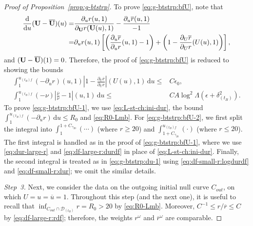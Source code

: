 \documentclass[10pt, reqno]{amsart}
\theoremstyle{definition}
\theoremstyle{remark}
\theoremstyle{conjecture}
\numberwithin{equation}{section}
\newcommand{\ud}{\mathrm{d}}
\newcommand{\rd}{\partial}
\newcommand{\0}{\emptyset}
\newcommand{\gmm}{\gamma}
\newcommand{\dlt}{\delta}
\newcommand{\eps}{\epsilon}
\newcommand{\Lmb}{\Lambda}
\newcommand{\omg}{\omega}
\newcommand{\bfU}{{\bf U}}
\newcommand{\calD}{\mathcal D}
\newcommand{\calI}{\mathcal I}
\newcommand{\dur}{\nu}
\newcommand{\pfstep}[1]{\vspace{.5em} {\it \noindent #1.}}
\newcommand{\NI}{\calI^{+}}						%
\newcommand{\ubg}{\overline{u}}					%
\newcommand{\durbg}{\overline{\dur}}				%
\newcommand{\rbg}{\overline{r}}					%
\newcommand{\Abs}[1]{\left\vert #1 \right\vert}
\begin{document}
\begin{proof}[Proof of Proposition~\ref{prop:g-btstrp}]
To prove \eqref{eq:g-btstrp:bfU}, note that 
\begin{align*}
	\frac{\ud}{\ud u} (\bfU - \overline{\bfU})(u)
	 = & \frac{\rd_{u} r(u, 1)}{\rd_{\bfU} r(\bfU(u), 1)} - \frac{\rd_{u} \rbg(u, 1)}{-1} \\
	 = & \rd_{u} r(u, 1) \left[ \left(\frac{\rd_{u} \rbg}{\rd_{u} r} (u,1) - 1 \right) 
	 + \left( 1 - \frac{\rd_{U} \rbg}{\rd_{U} r}(U(u), 1) \right) \right],
\end{align*}
and $(\bfU - \overline{\bfU})(1) = 0$. Therefore, the proof of \eqref{eq:g-btstrp:bfU} is reduced to showing the bounds
\begin{align}
	\int_{1}^{u_{(t_{B}) f}} (- \rd_{u} r)(u, 1) \Abs{1 - \frac{\rd_{U} \rbg}{\rd_{U} r}}(U(u), 1)  \, \ud u \leq & C \eps_{0},
	\label{eq:g-btstrp:bfU-1} \\
	\int_{1}^{u_{(t_{B}) f}} (- \dur) \Abs{\frac{\durbg}{\dur} - 1}(u, 1)  \, \ud u \leq & C A \log^2 \Lmb \left( \eps + \dlt_{(t_{B})}^{2} \right). \label{eq:g-btstrp:bfU-2} 
\end{align}
To prove \eqref{eq:g-btstrp:bfU-1}, we use \eqref{eq:L-st-ch:ini-dur}, the bound $\int_{1}^{u_{(t_{B}) f}} (-\rd_{u} r) \, \ud u \leq R_{0}$ and \eqref{eq:R0-Lmb}. For \eqref{eq:g-btstrp:bfU-2}, we first split the integral into $\int_{1}^{1 + C_{\gmm_{20}}} (\cdots)$ (where $r \geq 20$) and $\int_{1 + C_{\gmm_{20}}}^{u_{(t_{B}) f}} (\cdot)$ (where $r \leq 20$). The first integral is handled as in the proof of \eqref{eq:g-btstrp:bfU-1}, where we use \eqref{eq:dur-large-r} and \eqref{eq:df-large-r:durdf} in place of \eqref{eq:L-st-ch:ini-dur}. Finally, the second integral is treated as in \eqref{eq:g-btstrp:du-1} using \eqref{eq:df-small-r:logdurdf} and \eqref{eq:df-small-r:dur}; we omit the similar details.

\pfstep{Step~3} Next, we consider the data on the outgoing initial null curve $C_{out}$, on which $U = u = \ubg = 1$. Throughout this step (and the next one), it is useful to recall that $\inf_{C_{out} \cap \calD_{(t_{B})}} r = R_{0} > 20$ by \eqref{eq:R0-Lmb}. Moreover, $C^{-1} \leq r / \rbg \leq C$ by \eqref{eq:df-large-r:rdf}; therefore, the weights $r^{\omg}$ and $\rbg^{\omg}$ are comparable.


\end{proof}
\end{document}
